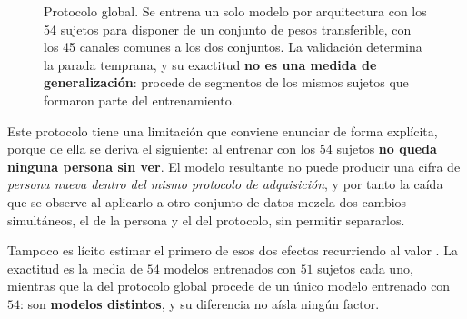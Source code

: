 \begin{figure}[H]
\centering
{}
\caption{Protocolo global. Se entrena un solo modelo por arquitectura con los 54 sujetos
para disponer de un conjunto de pesos transferible, con los 45 canales comunes a los dos
conjuntos. La validación determina la parada temprana, y su exactitud \textbf{no es una medida
de generalización}: procede de segmentos de los mismos sujetos que formaron parte del
entrenamiento.}
\label{fig:global}
\end{figure}

Este protocolo tiene una limitación que conviene enunciar de forma explícita, porque de
ella se deriva el siguiente: al entrenar con los $54$ sujetos \textbf{no queda ninguna persona
sin ver}. El modelo resultante no puede producir una cifra de \emph{persona nueva dentro
del mismo protocolo de adquisición}, y por tanto la caída que se observe al aplicarlo a otro
conjunto de datos mezcla dos cambios simultáneos, el de la persona y el del protocolo, sin
permitir separarlos.

Tampoco es lícito estimar el primero de esos dos efectos recurriendo al valor \loso{}. La
exactitud \loso{} es la media de $54$ modelos entrenados con $51$ sujetos cada uno, mientras
que la del protocolo global procede de un único modelo entrenado con $54$: son
\textbf{modelos distintos}, y su diferencia no aísla ningún factor.

